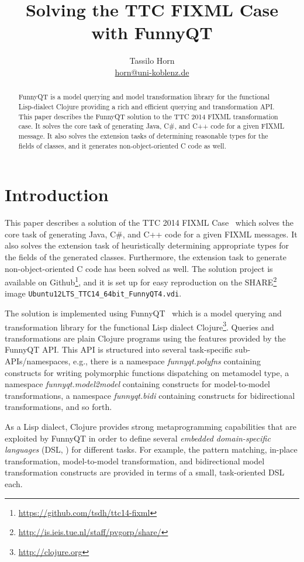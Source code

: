 \documentclass[a4paper]{article}
\title{Solving the TTC FIXML Case with FunnyQT}
\author{Tassilo Horn\\
  \href{mailto:horn@uni-koblenz.de}{horn@uni-koblenz.de}}
\begin{document}
\maketitle

\begin{abstract}
  FunnyQT is a model querying and model transformation library for the
  functional Lisp-dialect Clojure providing a rich and efficient querying and
  transformation API.  This paper describes the FunnyQT solution to the TTC
  2014 FIXML transformation case.  It solves the core task of generating Java,
  C\#, and C++ code for a given FIXML message.  It also solves the extension
  tasks of determining reasonable types for the fields of classes, and it
  generates non-object-oriented C code as well.
\end{abstract}


\section{Introduction}
\label{sec:introduction}

This paper describes a solution of the TTC 2014 FIXML
Case~\cite{fixml-case-desc} which solves the core task of generating Java, C\#,
and C++ code for a given FIXML messages.  It also solves the extension task of
heuristically determining appropriate types for the fields of the generated
classes.  Furthermore, the extension task to generate non-object-oriented C
code has been solved as well.  The solution project is available on
Github\footnote{\url{https://github.com/tsdh/ttc14-fixml}}, and it is set up
for easy reproduction on the
SHARE\footnote{\url{http://is.ieis.tue.nl/staff/pvgorp/share/}} image
\texttt{Ubuntu12LTS\_TTC14\_64bit\_FunnyQT4.vdi}.

The solution is implemented using FunnyQT~\cite{Horn2013MQWFQ} which is a model
querying and transformation library for the functional Lisp dialect
Clojure\footnote{\url{http://clojure.org}}.  Queries and transformations are
plain Clojure programs using the features provided by the FunnyQT API.  This
API is structured into several task-specific sub-APIs/namespaces, e.g., there
is a namespace \emph{funnyqt.polyfns} containing constructs for writing
polymorphic functions dispatching on metamodel type, a namespace
\emph{funnyqt.model2model} containing constructs for model-to-model
transformations, a namespace \emph{funnyqt.bidi} containing constructs for
bidirectional transformations, and so forth.

As a Lisp dialect, Clojure provides strong metaprogramming capabilities that
are exploited by FunnyQT in order to define several \emph{embedded
  domain-specific languages} (DSL, \cite{book:Fowler2010DSL}) for different
tasks.  For example, the pattern matching, in-place transformation,
model-to-model transformation, and bidirectional model transformation
constructs are provided in terms of a small, task-oriented DSL each.
\end{document}

